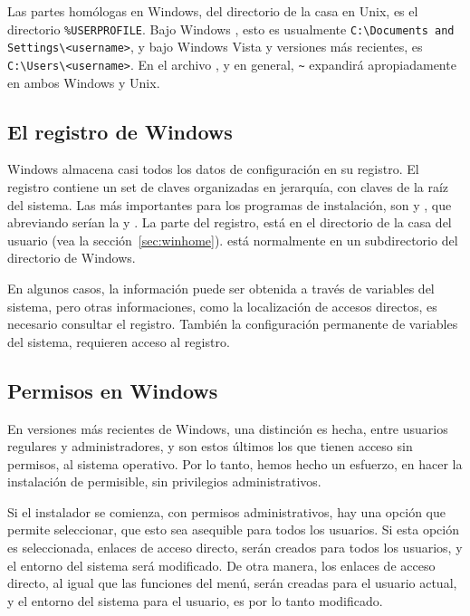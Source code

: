 \documentclass{article}
\begin{document}
Las partes homólogas en Windows, del directorio de la casa en Unix, es el
directorio \verb|%USERPROFILE|. Bajo Windows , esto es usualmente
\verb|C:\Documents and Settings\<username>|, y bajo Windows Vista y
versiones más recientes, es \verb|C:\Users\<username>|. En el archivo
, y \KPS{} en general, \verb|~| expandirá
apropiadamente en ambos Windows y Unix. 

\subsection{El registro de Windows}
\label{sec:registry}

Windows almacena casi todos los datos de configuración en su registro. El
registro contiene un set de claves organizadas en jerarquía, con claves de
la raíz del sistema. Las más importantes para los programas de
instalación, son  y , que
abreviando serían la  y . La parte  del
registro, está en el directorio de la casa del usuario (vea la
sección~\ref{sec:winhome}).  está normalmente en un
subdirectorio del directorio de Windows.

En algunos casos, la información puede ser obtenida a través de variables
del sistema, pero otras informaciones, como la localización de accesos
directos, es necesario consultar el registro. También la configuración
permanente de variables del sistema, requieren acceso al registro.

\subsection{Permisos en Windows}
\label{sec:winpermissions}

En versiones más recientes de Windows, una distinción es hecha, entre
usuarios regulares y administradores, y son estos últimos los que tienen
acceso sin permisos, al sistema operativo. Por lo tanto, hemos hecho un
esfuerzo, en hacer la instalación de \TL{} permisible, sin privilegios
administrativos. 

Si el instalador se comienza, con permisos administrativos, hay una
opción que permite seleccionar, que esto sea asequible para todos los
usuarios. Si esta opción es seleccionada, enlaces de acceso directo,
serán creados para todos los usuarios, y el entorno del sistema será
modificado. De otra manera, los enlaces de acceso directo, al igual
que las funciones del menú, serán creadas para el usuario actual, y el
entorno del sistema para el usuario, es por lo tanto modificado. 
\end{document}
